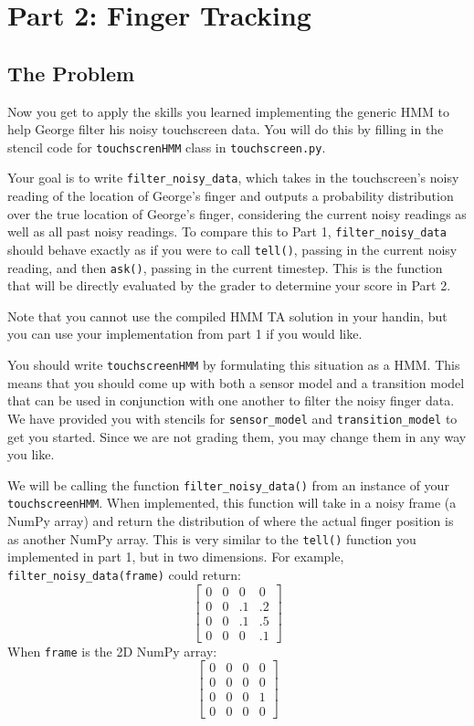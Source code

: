 \documentclass{article}
\begin{document}
\section{Part 2: Finger Tracking}
\subsection{The Problem}
Now you get to apply the skills you learned implementing the generic HMM to help George filter his noisy touchscreen data. You will do this by filling in the stencil code for \texttt{touchscrenHMM} class in \texttt{touchscreen.py}.

Your goal is to write \texttt{filter\_noisy\_data}, which takes in the touchscreen’s noisy reading of the location of George’s finger and outputs a probability distribution over the true location of George’s finger, considering the current noisy readings as well as all past noisy readings. To compare this to Part 1, \texttt{filter\_noisy\_data} should behave exactly as if you were to call \texttt{tell()}, passing in the current noisy reading, and then \texttt{ask()}, passing in the current timestep. This is the function that will be directly evaluated by the grader to determine your score in Part 2.

Note that you cannot use the compiled HMM TA solution in your handin, but you can use your implementation from part 1 if you would like.

You should write \texttt{touchscreenHMM} by formulating this situation as a HMM. This means that you should come up with both a sensor model and a transition model that can be used in conjunction with one another to filter the noisy finger data. We have provided you with stencils for \texttt{sensor\_model} and \texttt{transition\_model} to get you started. Since we are not grading them, you may change them in any way you like.

We will be calling the function \texttt{filter\_noisy\_data()} from an instance of your \texttt{touchscreenHMM}. When implemented, this function will take in a noisy frame (a NumPy array) and return the distribution of where the actual finger position is as another NumPy array. This is very similar to the \texttt{tell()} function you implemented in part 1, but in two dimensions. For example, \texttt{filter\_noisy\_data(frame)} could return:
\[
\begin{bmatrix}
    0 & 0 & 0 & 0 \\
    0 & 0 & .1 & .2 \\
    0 & 0 & .1 & .5 \\
    0 & 0 & 0 & .1
\end{bmatrix}
\]
When \texttt{frame} is the 2D NumPy array:
\[
\begin{bmatrix}
    0 & 0 & 0 & 0 \\
    0 & 0 & 0 & 0 \\
    0 & 0 & 0 & 1 \\
    0 & 0 & 0 & 0
\end{bmatrix}
\]
\end{document}

